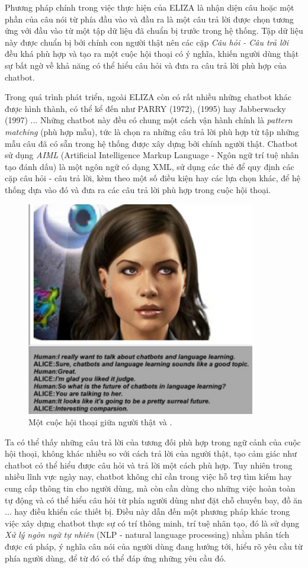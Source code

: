 \documentclass[12pt]{report}
\begin{document}
Phương pháp chính trong việc thực hiện của ELIZA là nhận diện câu hoặc một phần của câu nói từ phía đầu vào và đầu ra là một câu trả lời được chọn tương ứng với đầu vào từ một tập dữ liệu đã chuẩn bị trước trong hệ thống. Tập dữ liệu này được chuẩn bị bởi chính con người thật nên các cặp \textit{Câu hỏi - Câu trả lời} đều khá phù hợp và tạo ra một cuộc hội thoại có ý nghĩa, khiến người dùng thật sự bất ngờ về khả năng có thể hiểu câu hỏi và đưa ra câu trả lời phù hợp của chatbot.

Trong quá trình phát triển, ngoài ELIZA còn có rất nhiều những chatbot khác được hình thành, có thể kể đến như PARRY (1972), \alice{} (1995) hay Jabberwacky (1997) ... Những chatbot này đều có chung một cách vận hành chính là \textit{pattern matching} (phù hợp mẫu), tức là chọn ra những câu trả lời phù hợp từ tập những mẫu câu đã có sẵn trong hệ thống được xây dựng bởi chính người thật. Chatbot \alice{} sử dụng \textit{AIML} (Artificial Intelligence Markup Language - Ngôn ngữ trí tuệ nhân tạo đánh dấu) là một ngôn ngữ có dạng XML, sử dụng các thẻ để quy định các cặp câu hỏi - câu trả lời, kèm theo một số điều kiện hay các lựa chọn khác, để hệ thống dựa vào đó và đưa ra các câu trả lời phù hợp trong cuộc hội thoại.

\begin{figure}[H]
  \centering
    \includegraphics[width=10cm]{Pics/Chap1/alice.jpg}
  \caption{Một cuộc hội thoại giữa người thật và \alice{}.}
\end{figure}

Ta có thể thấy những câu trả lời của \alice{} tương đối phù hợp trong ngữ cảnh của cuộc hội thoại, không khác nhiều so với cách trả lời của người thật, tạo cảm giác như chatbot có thể hiểu được câu hỏi và trả lời một cách phù hợp. Tuy nhiên trong nhiều lĩnh vực ngày nay, chatbot không chỉ cần trong việc hỗ trợ tìm kiếm hay cung cấp thông tin cho người dùng, mà còn cần dùng cho những việc hoàn toàn tự động và có thể hiểu câu hỏi từ phía người dùng như đặt chỗ chuyến bay, đồ ăn ... hay điều khiển các thiết bị. Điều này dẫn đến một phương pháp khác trong việc xây dựng chatbot thực sự có trí thông minh, trí tuệ nhân tạo, đó là sử dụng \textit{Xử lý ngôn ngữ tự nhiên} (NLP - natural language processing) nhằm phân tích được cú pháp, ý nghĩa câu nói của người dùng đang hướng tới, hiểu rõ yêu cầu từ phía người dùng, để từ đó có thể đáp ứng những yêu cầu đó.
\end{document}
